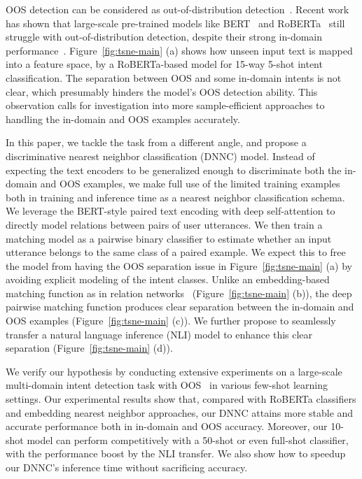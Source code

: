 OOS detection can be considered as out-of-distribution detection~\citep{softmax_conf,learning_ood}.
Recent work has shown that large-scale pre-trained models like BERT~\citep{bert} and RoBERTa~\citep{roberta} still struggle with out-of-distribution detection, despite their strong in-domain performance~\citep{acl-ood}.
Figure~\ref{fig:tsne-main} (a) shows how unseen input text is mapped into a feature space, by a RoBERTa-based model for 15-way 5-shot intent classification.
The separation between OOS and some in-domain intents is not clear, which presumably hinders the model's OOS detection ability.
This observation calls for investigation into more sample-efficient approaches to handling the in-domain and OOS examples accurately.

In this paper, we tackle the task from a different angle, and propose a discriminative nearest neighbor classification (DNNC) model.
Instead of expecting the text encoders to be generalized enough to discriminate both the in-domain and OOS examples, we make full use of the limited training examples both in training and inference time as a nearest neighbor classification schema.
We leverage the BERT-style paired text encoding with deep self-attention to directly model relations between pairs of user utterances.
We then train a matching model as a pairwise binary classifier to estimate whether an input utterance belongs to the same class of a paired example.
We expect this to free the model from having the OOS separation issue in Figure~\ref{fig:tsne-main} (a) by avoiding explicit modeling of the intent classes.
Unlike an embedding-based matching function as in relation networks~\citep{relation_net} (Figure~\ref{fig:tsne-main} (b)), the deep pairwise matching function produces clear separation between the in-domain and OOS examples (Figure~\ref{fig:tsne-main} (c)).
We further propose to seamlessly transfer a natural language inference (NLI) model to enhance this clear separation (Figure~\ref{fig:tsne-main} (d)).

We verify our hypothesis by conducting extensive experiments on a large-scale multi-domain intent detection task with OOS~\citep{oos-intent} in various few-shot learning settings.
Our experimental results show that, compared with RoBERTa classifiers and embedding nearest neighbor approaches, our DNNC attains more stable and accurate performance both in in-domain and OOS accuracy.
Moreover, our 10-shot model can perform competitively with a 50-shot or even full-shot classifier, with the performance boost by the NLI transfer.
We also show how to speedup our DNNC's inference time without sacrificing accuracy.
